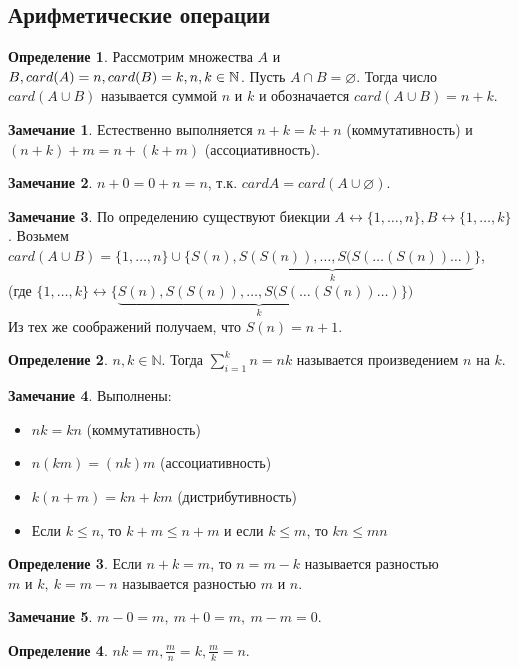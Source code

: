 \documentclass[a4paper, 12pt]{article}
\newcommand{\N}{\mathbb{N}}
\renewcommand{\emptyset}{\varnothing}
\theoremstyle{definition}
\newtheorem*{definition}{Определение}
\newtheorem*{comm}{Замечание}
\begin{document}
    \subsection{Арифметические операции}
        \begin{definition}
            Рассмотрим множества $A$ и $B, card(A)=n, card(B)=k,\\
            n,k\in \N$. Пусть $A\cap B=\emptyset$. Тогда число $card(A\cup B)$ называется суммой $n$ и $k$ и обозначается $card(A\cup B)=n+k$.
        \end{definition}
        \begin{comm}
            Естественно выполняется $n+k=k+n$ (коммутативность) и\\ $(n+k)+m=n+(k+m)$ (ассоциативность).
        \end{comm}
        \begin{comm}
            $n+0=0+n=n$, т.к. $cardA=card(A\cup \emptyset)$.
        \end{comm}
        \begin{comm}
            По определению существуют биекции $A \leftrightarrow \{1,\dots, n\}, B\leftrightarrow \{1,\dots, k\}$. Возьмем $card(A\cup B)=\{1,\dots, n\}\cup \{\underbrace{S(n), S(S(n)), \dots, S(S(\dots (S(n))\dots)}_k\}$,\\ (где $\{1,\dots, k\} \leftrightarrow \{\underbrace{S(n), S(S(n)), \dots, S(S(\dots (S(n))\dots)}_k\})$\\
            Из тех же соображений получаем, что $S(n)=n+1$.
        \end{comm} 
        \begin{definition}
            $n,k\in \N$. Тогда $\sum\limits_{i=1}^kn=nk$ называется произведением $n$ на $k$.
        \end{definition}
        \begin{comm} Выполнены:
            \begin{itemize}
                \item $nk=kn$ (коммутативность)
                \item $n(km)=(nk)m$ (ассоциативность)
                \item $k(n+m)=kn+km$ (дистрибутивность)
                \item Если $k\leq n$, то $k+m\leq n+m$ и если $k\leq m$, то $kn\leq mn$
            \end{itemize}
        \end{comm}
        \begin{definition}
            Если $n+k=m$, то $n=m-k$ называется разностью\\ $m$ и $k,\ k=m-n$ называется разностью $m$ и $n$.
        \end{definition}
        \begin{comm}
            $m-0=m,\ m+0=m,\ m-m=0$.
        \end{comm}
        \begin{definition}
            $nk=m, \frac{m}{n}=k, \frac{m}{k}=n$.
        \end{definition}
\end{document}
